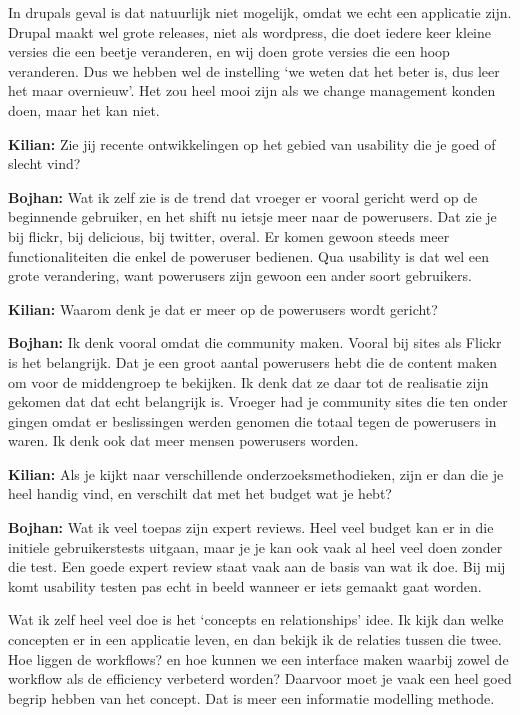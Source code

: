 In drupals geval is dat natuurlijk niet mogelijk, omdat we echt een applicatie zijn. Drupal maakt wel grote releases, niet als wordpress, die doet iedere keer kleine versies die een beetje veranderen, en wij doen grote versies die een hoop veranderen. Dus we hebben wel de instelling `we weten dat het beter is, dus leer het maar overnieuw'. Het zou heel mooi zijn als we change management konden doen, maar het kan niet.

\textbf{Kilian:} Zie jij recente ontwikkelingen op het gebied van usability die je goed of slecht vind?

\textbf{Bojhan:} Wat ik zelf zie is de trend dat vroeger er vooral gericht werd op de beginnende gebruiker, en het shift nu ietsje meer naar de powerusers. Dat zie je bij flickr, bij delicious, bij twitter, overal. Er komen gewoon steeds meer functionaliteiten die enkel de poweruser bedienen. Qua usability is dat wel een grote verandering, want powerusers zijn gewoon een ander soort gebruikers.

\textbf{Kilian:} Waarom denk je dat er meer op de powerusers wordt gericht?

\textbf{Bojhan:} Ik denk vooral omdat die community maken. Vooral bij sites als Flickr is het belangrijk. Dat je een groot aantal powerusers hebt die de content maken om voor de middengroep te bekijken. Ik denk dat ze daar tot de realisatie zijn gekomen dat dat echt belangrijk is. Vroeger had je community sites die ten onder gingen omdat er beslissingen werden genomen die totaal tegen de powerusers in waren. Ik denk ook dat meer mensen powerusers worden.

\textbf{Kilian:} Als je kijkt naar verschillende onderzoeksmethodieken, zijn er dan die je heel handig vind, en verschilt dat met het budget wat je hebt?

\textbf{Bojhan:}  Wat ik veel toepas zijn expert reviews. Heel veel budget kan er in die initiele gebruikerstests uitgaan, maar je je kan ook vaak al heel veel doen zonder die test. Een goede expert review staat vaak aan de basis van wat ik doe. Bij mij komt usability testen pas echt in beeld wanneer er iets gemaakt gaat worden.

Wat ik zelf heel veel doe is het `concepts en relationships' idee. Ik kijk dan welke concepten er in een applicatie leven, en dan bekijk ik de relaties tussen die twee. Hoe liggen de workflows? en hoe kunnen we een interface maken waarbij zowel de workflow als de efficiency verbeterd worden? Daarvoor moet je vaak een heel goed begrip hebben van het concept. Dat is meer een informatie modelling methode.

